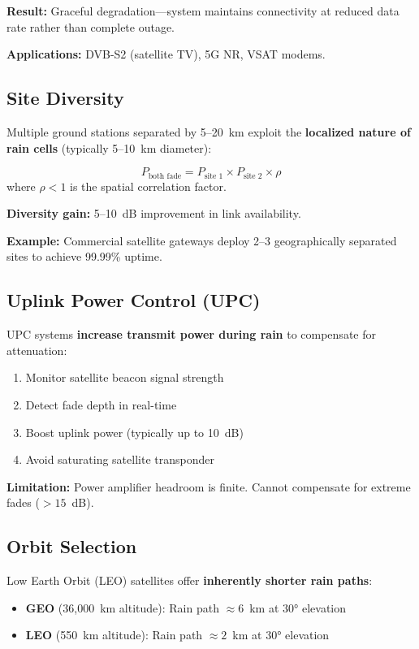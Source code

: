 \textbf{Result:} Graceful degradation---system maintains connectivity at reduced data rate rather than complete outage.

\textbf{Applications:} DVB-S2 (satellite TV), 5G NR, VSAT modems.

\subsection{Site Diversity}

Multiple ground stations separated by 5--20~km exploit the \textbf{localized nature of rain cells} (typically 5--10~km diameter):

\begin{equation}
P_{\text{both fade}} = P_{\text{site 1}} \times P_{\text{site 2}} \times \rho
\end{equation}
where $\rho < 1$ is the spatial correlation factor.

\textbf{Diversity gain:} 5--10~dB improvement in link availability.

\textbf{Example:} Commercial satellite gateways deploy 2--3 geographically separated sites to achieve 99.99\% uptime.

\subsection{Uplink Power Control (UPC)}

UPC systems \textbf{increase transmit power during rain} to compensate for attenuation:

\begin{enumerate}
\item Monitor satellite beacon signal strength
\item Detect fade depth in real-time
\item Boost uplink power (typically up to 10~dB)
\item Avoid saturating satellite transponder
\end{enumerate}

\textbf{Limitation:} Power amplifier headroom is finite. Cannot compensate for extreme fades ($> 15$~dB).

\subsection{Orbit Selection}

Low Earth Orbit (LEO) satellites offer \textbf{inherently shorter rain paths}:

\begin{itemize}
\item \textbf{GEO} (36,000~km altitude): Rain path $\approx 6$~km at 30° elevation
\item \textbf{LEO} (550~km altitude): Rain path $\approx 2$~km at 30° elevation
\end{itemize}


